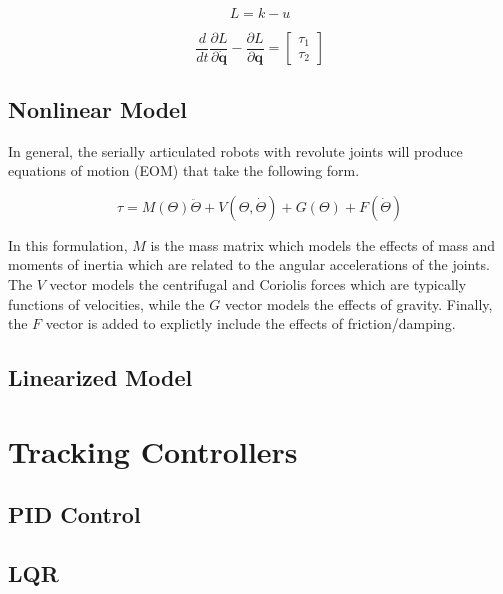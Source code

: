 \documentclass[journal]{IEEEtran}
\begin{document}
\begin{equation}
  L = k - u
\end{equation}

\begin{equation}
\frac{d}{d t} \frac{\partial L}{\partial \dot{\boldsymbol{q}}}-\frac{\partial L}{\partial \boldsymbol{q}}=\left[\begin{array}{l}
\tau_{1} \\
\tau_{2}
\end{array}\right]
\end{equation}


\subsection{Nonlinear Model}
In general, the serially articulated robots with revolute joints will produce equations of motion (EOM) that take the following form.

\begin{equation}
  \tau = M(\Theta)\ddot{\Theta} + V(\Theta, \dot{\Theta}) + G(\Theta) + F(\dot{\Theta})
\end{equation}


In this formulation, $M$ is the mass matrix which models the effects of mass and moments of inertia which are related to the angular accelerations of the joints. The $V$ vector models the centrifugal and Coriolis forces which are typically functions of velocities, while the $G$ vector models the effects of gravity. Finally, the $F$ vector is added to explictly include the effects of friction/damping.




\subsection{Linearized Model}

\section{Tracking Controllers}

 \subsection{PID Control}

 \subsection{LQR}
\end{document}
